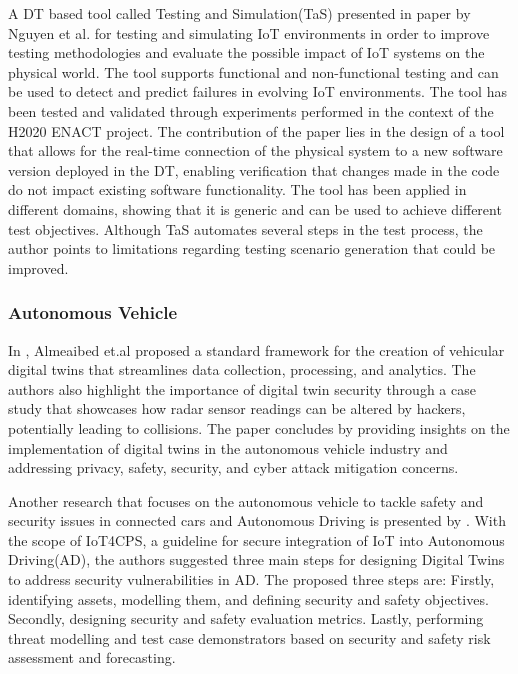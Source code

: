 A DT based tool called Testing and Simulation(TaS) presented in\cite{luongnguyenDigitalTwinIoT2022} paper by Nguyen et al. for testing and simulating IoT environments in order to improve testing methodologies and evaluate the possible impact of IoT systems on the physical world. The tool supports functional and non-functional testing and can be used to detect and predict failures in evolving IoT environments. The tool has been tested and validated through experiments performed in the context of the H2020 ENACT project. The contribution of the paper lies in the design of a tool that allows for the real-time connection of the physical system to a new software version deployed in the DT, enabling verification that changes made in the code do not impact existing software functionality. The tool has been applied in different domains, showing that it is generic and can be used to achieve different test objectives. Although TaS automates several steps in the test process, the author points to limitations regarding testing scenario generation that could be improved.


\subsubsection{Autonomous Vehicle}
In \cite{almeaibedDigitalTwinAnalysis2021}, Almeaibed et.al proposed a standard framework for the creation of vehicular digital twins that streamlines data collection, processing, and analytics. The authors also highlight the importance of digital twin security through a case study that showcases how radar sensor readings can be altered by hackers, potentially leading to collisions. The paper concludes by providing insights on the implementation of digital twins in the autonomous vehicle industry and addressing privacy, safety, security, and cyber attack mitigation concerns.

Another research that focuses on the autonomous vehicle to tackle safety and security issues in connected cars and Autonomous Driving is presented by \cite{veledarDigitalTwinsDependability2019}.
With the scope of IoT4CPS, a guideline for secure integration of IoT into Autonomous Driving(AD), the authors suggested three main steps for designing Digital Twins to address security vulnerabilities in AD. The proposed three steps are: Firstly, identifying assets, modelling them, and defining security and safety objectives. Secondly, designing security and safety evaluation metrics. Lastly, performing threat modelling and test case demonstrators based on security and safety risk assessment and forecasting.


